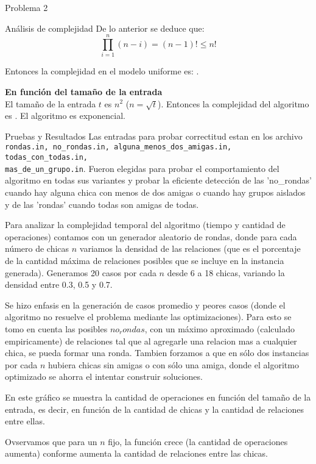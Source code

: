 \begin{section}{Problema 2}
\begin{subsection}{Análisis de complejidad}
			De lo anterior se deduce que: $$\displaystyle\prod_{i=1}^n (n-i) = (n-1)! \leq n!$$

			Entonces la complejidad en el modelo uniforme es:  .\VSP
		
			\noindent\textbf{En función del tamaño de la entrada}\\

				El tamaño de la entrada $t$ es $n^2$ ($n=\sqrt t$). Entonces la complejidad del algoritmo es . El algoritmo es exponencial.
	\end{subsection}

	\begin{subsection}{Pruebas y Resultados}
		Las entradas para probar correctitud estan en los archivo \texttt{rondas.in, no\_rondas.in, alguna\_menos\_dos\_amigas.in, todas\_con\_todas.in, \\
		mas\_de\_un\_grupo.in}.
		Fueron elegidas para probar el comportamiento del algoritmo en todas sus variantes y probar la eficiente detección de las 'no\_rondas' cuando hay alguna chica con menos de dos amigas o cuando hay grupos aislados y de las 'rondas' cuando todas son amigas de todas.
		
		Para analizar la complejidad temporal del algoritmo (tiempo y cantidad de operaciones) contamos con un generador aleatorio de rondas, donde para cada número de chicas $n$ variamos la densidad de las relaciones (que es el porcentaje de la cantidad máxima de relaciones posibles que se incluye en la instancia generada). Generamos 20 casos por cada $n$ desde 6 a 18 chicas, variando la densidad entre 0.3, 0.5 y 0.7.

		 Se hizo enfasis en la generación de casos promedio y peores casos (donde el algoritmo no resuelve el problema mediante las optimizaciones). Para esto se tomo en cuenta las posibles $no_rondas$, con un máximo aproximado (calculado empiricamente) de relaciones tal que al agregarle una relacion mas a cualquier chica, se pueda formar una ronda. Tambien forzamos a que en sólo dos instancias por cada $n$ hubiera chicas sin amigas o con sólo una amiga, donde el algoritmo optimizado se ahorra el intentar construir soluciones.


		En este gráfico se muestra la cantidad de operaciones en función del tamaño de la entrada, es decir, en función de la cantidad de chicas y la cantidad de relaciones entre ellas.

		Ovservamos que para un $n$ fijo, la función crece (la cantidad de operaciones aumenta) conforme aumenta la cantidad de relaciones entre las chicas.


\end{subsection}
\end{section}
